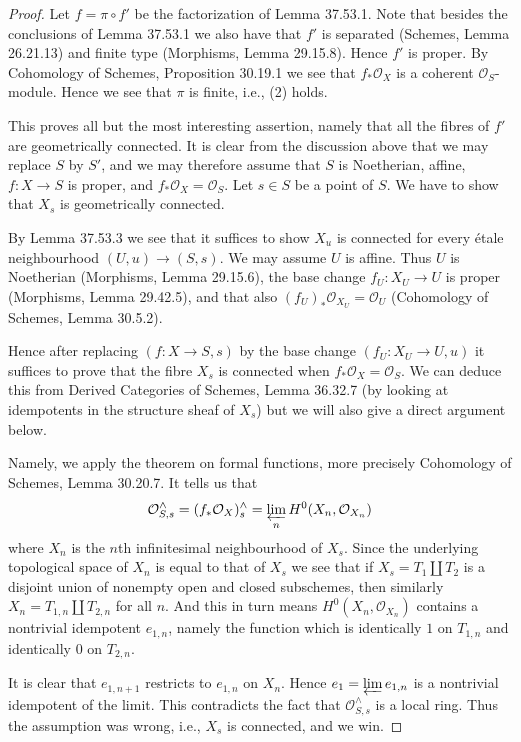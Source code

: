 \begin{proof}
Let $f=\pi\circ f'$ be the factorization of Lemma 37.53.1. Note that besides the conclusions of Lemma 37.53.1 we also have that $f'$ is separated (Schemes, Lemma 26.21.13) and finite type (Morphisms, Lemma 29.15.8). Hence $f'$ is proper. By Cohomology of Schemes, Proposition 30.19.1 we see that $f_*\mathcal O_X$ is a coherent $\mathcal O_S$-module. Hence we see that $\pi$ is finite, i.e., (2) holds.

This proves all but the most interesting assertion, namely that all the fibres of $f'$ are geometrically connected. It is clear from the discussion above that we may replace $S$ by $S'$, and we may therefore assume that $S$ is Noetherian, affine, $f:X\to S$ is proper, and $f_*\mathcal O_X=\mathcal O_S$. Let $s\in S$ be a point of $S$. We have to show that $X_s$ is geometrically connected.

By Lemma 37.53.3 we see that it suffices to show $X_u$ is connected for every \'etale neighbourhood $(U,u)\to(S,s)$. We may assume $U$ is affine. Thus $U$ is Noetherian (Morphisms, Lemma 29.15.6), the base change $f_U:X_U\to U$ is proper (Morphisms, Lemma 29.42.5), and that also $(f_U)_*\mathcal O_{X_U}=\mathcal O_U$ (Cohomology of Schemes, Lemma 30.5.2).

Hence after replacing $(f:X\to S,s)$ by the base change $(f_U:X_U\to U,u)$ it suffices to prove that the fibre $X_s$ is connected when $f_*\mathcal O_X=\mathcal O_S$. We can deduce this from Derived Categories of Schemes, Lemma 36.32.7 (by looking at idempotents in the structure sheaf of $X_s$) but we will also give a direct argument below.

Namely, we apply the theorem on formal functions, more precisely Cohomology of Schemes, Lemma 30.20.7. It tells us that
\[\mathcal O_{S,s}^{\wedge}=(f_*\mathcal O_X)_s^{\wedge}=\varprojlim_n H^0(X_n,\mathcal O_{X_n})\]
where $X_n$ is the $n$th infinitesimal neighbourhood of $X_s$. Since the underlying topological space of $X_n$ is equal to that of $X_s$ we see that if $X_s=T_1\amalg T_2$ is a disjoint union of nonempty open and closed subschemes, then similarly $X_n=T_{1,n}\amalg T_{2,n}$ for all $n$. And this in turn means $H^0(X_n,\mathcal O_{X_n})$ contains a nontrivial idempotent $e_{1,n}$, namely the function which is identically $1$ on $T_{1,n}$ and identically $0$ on $T_{2,n}$.

It is clear that $e_{1,n+1}$ restricts to $e_{1,n}$ on $X_n$. Hence $e_1=\varprojlim e_{1,n}$ is a nontrivial idempotent of the limit. This contradicts the fact that $\mathcal O_{S,s}^{\wedge}$ is a local ring. Thus the assumption was wrong, i.e., $X_s$ is connected, and we win.
\end{proof}
